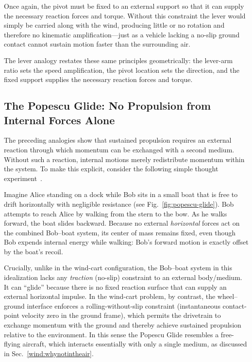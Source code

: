 \documentclass[reprint,aps,pra,longbibliography]{revtex4-2}
\begin{document}
Once again, the pivot must be fixed to an external support so that it can supply the necessary reaction forces and torque. Without this constraint the lever would simply be carried along with the wind, producing little or no rotation and therefore no kinematic amplification---just as a vehicle lacking a no-slip ground contact cannot sustain motion faster than the surrounding air.

The lever analogy restates these same principles geometrically: the lever-arm
ratio sets the speed amplification, the pivot location sets the direction, and
the fixed support supplies the necessary reaction forces and torque.

\subsection{The Popescu Glide: No Propulsion from Internal Forces Alone}

The preceding analogies show that sustained propulsion requires an external
reaction through which momentum can be exchanged with a second medium. Without
such a reaction, internal motions merely redistribute momentum within the
system. To make this explicit, consider the following simple thought
experiment~\cite{popescu_talk_2024}.

Imagine Alice standing on a dock while Bob sits in a small boat that is free to
drift horizontally with negligible resistance (see Fig.~\ref{fig:popescu-glide}). Bob attempts to reach Alice by
walking from the stern to the bow. As he walks forward, the boat slides
backward. Because no external \emph{horizontal} forces act on the combined
Bob--boat system, its center of mass remains fixed, even though Bob expends internal energy while walking: Bob's forward motion is
exactly offset by the boat's recoil.

Crucially, unlike in the wind-cart configuration, the Bob--boat system in this
idealization lacks any \emph{traction} (no-slip) constraint to an external
body/medium. It can ``glide'' because there is no fixed reaction surface that
can supply an external horizontal impulse. In the wind-cart problem, by
contrast, the wheel--ground interface enforces a rolling-without-slip
constraint (instantaneous contact-point velocity zero in the ground frame),
which permits the drivetrain to exchange momentum with the ground and thereby
achieve sustained propulsion relative to the environment. In this sense the
Popescu Glide resembles a free-flying aircraft, which interacts essentially
with only a single medium, as discussed in Sec.~\ref{wind:whynotintheair}.
\end{document}
